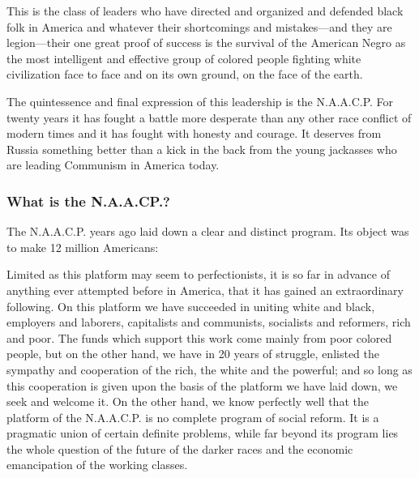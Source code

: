 \documentclass[letterpaper,10pt,english]{jupyterBook}
\begin{document}
\sphinxAtStartPar
This is the class of leaders who have directed and organized and defended black folk in America and whatever their shortcomings and mistakes—and they are legion—their one great proof of success is the survival of the American Negro as the most intelligent and effective group of colored people fighting white civilization face to face and on its own ground, on the face of the earth.

\sphinxAtStartPar
The quintessence and final expression of this leadership is the N.A.A.C.P. For twenty years it has fought a battle more desperate than any other race conflict of modern times and it has fought with honesty and courage. It deserves from Russia something better than a kick in the back from the young jackasses who are leading Communism in America today.


\subsubsection{What is the N.A.A.CP.?}
\label{\detokenize{Volumes/38/09/negro_and_communism:what-is-the-n-a-a-cp}}
\sphinxAtStartPar
The N.A.A.C.P. years ago laid down a clear and distinct program. Its object was to make 12 million Americans:

\sphinxAtStartPar
{}

\sphinxAtStartPar
Limited as this platform may seem to perfectionists, it is so far in advance of anything ever attempted before in America, that it has gained an extraordinary following. On this platform we have succeeded in uniting white and black, employers and laborers, capitalists and communists, socialists and reformers, rich and poor. The funds which support this work come mainly from poor colored people, but on the other hand, we have in 20 years of struggle, enlisted the sympathy and cooperation of the rich, the white and the powerful; and so long as this cooperation is given upon the basis of the platform we have laid down, we seek and welcome it. On the other hand, we know perfectly well that the platform of the N.A.A.C.P. is no complete program of social reform. It is a pragmatic union of certain definite problems, while far beyond its program lies the whole question of the future of the darker races and the economic emancipation of the working classes.
\end{document}
